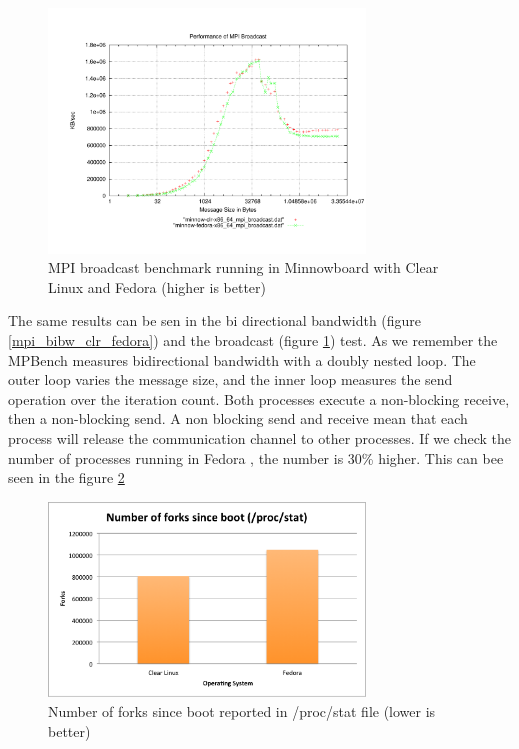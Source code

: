 \begin{figure}[H]
\centering
\includegraphics[width=0.75\textwidth]{images/mpbench_clr_experiments/mpi_broadcast.pdf}
\caption{MPI broadcast benchmark running in Minnowboard with Clear Linux and
Fedora (higher is better)}
\label{mpi_broadcast_clr_fedora}
\end{figure}

The same results can be sen in the bi directional bandwidth (figure
\ref{mpi_bibw_clr_fedora}) and the broadcast (figure
\ref{mpi_broadcast_clr_fedora}) test. As we remember the MPBench measures
bidirectional bandwidth with a doubly nested loop. The outer loop varies the
message size, and the inner loop measures the send operation over the iteration
count. Both processes execute a non-blocking receive, then a non-blocking send.
A non blocking send and receive mean that each process will release the
communication channel to other processes. If we check the number of processes
running in Fedora , the number is 30\% higher. This can bee seen in the figure
\ref{number_forks_fedora_clr}


\begin{figure}[H]
\centering
\includegraphics[width=0.75\textwidth]{images/number_forks.png}
\caption{Number of forks since boot reported in /proc/stat file (lower is better)}
\label{number_forks_fedora_clr}
\end{figure}

